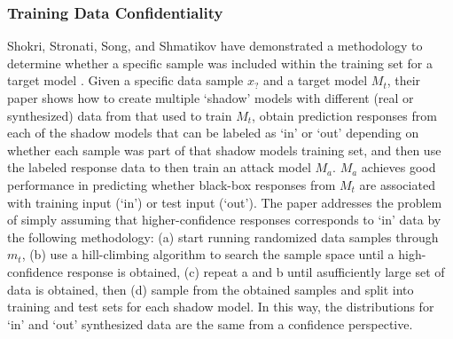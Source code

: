 \documentclass[11pt]{article}
\begin{document}
\subsubsection{Training Data Confidentiality}

Shokri, Stronati, Song, and Shmatikov have demonstrated a methodology to determine whether a specific sample was included within the training set for a target model \cite{shokri2017membership}.  Given a specific data sample $x_?$ and a target model $M_t$, their paper shows how to create multiple `shadow' models with different (real or synthesized) data from that used to train $M_t$, obtain prediction responses from each of the shadow models that can be labeled as `in' or `out' depending on whether each sample was part of that shadow models training set, and then use the labeled response data to then train an attack model $M_a$.  $M_a$ achieves good performance in predicting whether black-box responses from $M_t$ are associated with training input (`in') or test input (`out').  The paper addresses the problem of simply assuming that higher-confidence responses corresponds to `in' data by the following methodology: (a) start running randomized data samples through $m_t$, (b) use a hill-climbing algorithm to search the sample space until a high-confidence response is obtained, (c) repeat a and b until asufficiently large set of data is obtained, then (d) sample from the obtained samples and split into training and test sets for each shadow model.  In this way, the distributions for `in' and `out' synthesized data are the same from a confidence perspective.
\end{document}
